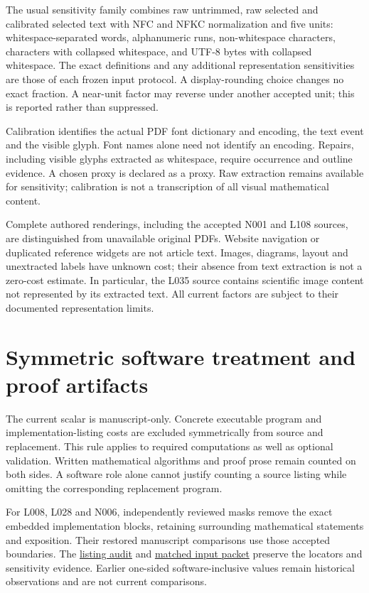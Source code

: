 \documentclass[11pt,a4paper]{article}
\begin{document}
The usual sensitivity family combines raw untrimmed, raw selected and
calibrated selected text with NFC and NFKC normalization and five units:
whitespace-separated words, alphanumeric runs, non-whitespace characters,
characters with collapsed whitespace, and UTF-8 bytes with collapsed whitespace.
The exact definitions and any additional representation sensitivities are those
of each frozen input protocol. A display-rounding choice changes no exact
fraction. A near-unit factor may reverse under another accepted unit; this is
reported rather than suppressed.

Calibration identifies the actual PDF font dictionary and encoding, the text
event and the visible glyph. Font names alone need not identify an encoding.
Repairs, including visible glyphs extracted as whitespace, require occurrence
and outline evidence. A chosen proxy is declared as a proxy. Raw extraction
remains available for sensitivity; calibration is not a transcription of all
visual mathematical content.

Complete authored renderings, including the accepted N001 and L108 sources,
are distinguished from unavailable original PDFs. Website navigation or
duplicated reference widgets are not article text. Images, diagrams, layout and
unextracted labels have unknown cost; their absence from text extraction is not
a zero-cost estimate. In particular, the L035 source contains scientific image
content not represented by its extracted text. All current factors are subject
to their documented representation limits.

\section{Symmetric software treatment and proof artifacts}

The current scalar is manuscript-only. Concrete executable program and
implementation-listing costs are excluded symmetrically from source and
replacement. This rule applies to required computations as well as optional
validation. Written mathematical algorithms and proof prose remain counted on
both sides. A software role alone cannot justify counting a source listing
while omitting the corresponding replacement program.

For L008, L028 and N006, independently reviewed masks remove the exact embedded
implementation blocks, retaining surrounding mathematical statements and
exposition. Their restored manuscript comparisons use those accepted boundaries.
The \href{overview/v11/listing\_audit/README.rst}{listing audit} and
\href{overview/v12/matched\_inputs/README.rst}{matched input packet} preserve the
locators and sensitivity evidence. Earlier one-sided software-inclusive values
remain historical observations and are not current comparisons.
\end{document}
